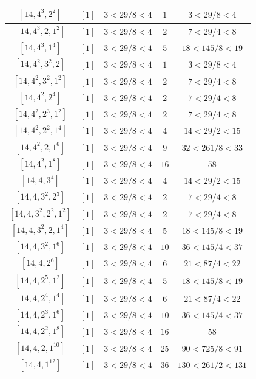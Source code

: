 \documentclass{article}%
\begin{document}
\begin{center}
\begin{longtable}{||c|c|c|c|c||}
$[14, 4^{3}, 2^{2}]$ & $[1]$ & $3 < 29/8 < 4$ & $1$ & $3 < 29/8 < 4$ \\ \hline 
$[14, 4^{3}, 2, 1^{2}]$ & $[1]$ & $3 < 29/8 < 4$ & $2$ & $7 < 29/4 < 8$ \\ \hline 
$[14, 4^{3}, 1^{4}]$ & $[1]$ & $3 < 29/8 < 4$ & $5$ & $18 < 145/8 < 19$ \\ \hline 
$[14, 4^{2}, 3^{2}, 2]$ & $[1]$ & $3 < 29/8 < 4$ & $1$ & $3 < 29/8 < 4$ \\ \hline 
$[14, 4^{2}, 3^{2}, 1^{2}]$ & $[1]$ & $3 < 29/8 < 4$ & $2$ & $7 < 29/4 < 8$ \\ \hline 
$[14, 4^{2}, 2^{4}]$ & $[1]$ & $3 < 29/8 < 4$ & $2$ & $7 < 29/4 < 8$ \\ \hline 
$[14, 4^{2}, 2^{3}, 1^{2}]$ & $[1]$ & $3 < 29/8 < 4$ & $2$ & $7 < 29/4 < 8$ \\ \hline 
$[14, 4^{2}, 2^{2}, 1^{4}]$ & $[1]$ & $3 < 29/8 < 4$ & $4$ & $14 < 29/2 < 15$ \\ \hline 
$[14, 4^{2}, 2, 1^{6}]$ & $[1]$ & $3 < 29/8 < 4$ & $9$ & $32 < 261/8 < 33$ \\ \hline 
$[14, 4^{2}, 1^{8}]$ & $[1]$ & $3 < 29/8 < 4$ & $16$ & $58$ \\ \hline 
$[14, 4, 3^{4}]$ & $[1]$ & $3 < 29/8 < 4$ & $4$ & $14 < 29/2 < 15$ \\ \hline 
$[14, 4, 3^{2}, 2^{3}]$ & $[1]$ & $3 < 29/8 < 4$ & $2$ & $7 < 29/4 < 8$ \\ \hline 
$[14, 4, 3^{2}, 2^{2}, 1^{2}]$ & $[1]$ & $3 < 29/8 < 4$ & $2$ & $7 < 29/4 < 8$ \\ \hline 
$[14, 4, 3^{2}, 2, 1^{4}]$ & $[1]$ & $3 < 29/8 < 4$ & $5$ & $18 < 145/8 < 19$ \\ \hline 
$[14, 4, 3^{2}, 1^{6}]$ & $[1]$ & $3 < 29/8 < 4$ & $10$ & $36 < 145/4 < 37$ \\ \hline 
$[14, 4, 2^{6}]$ & $[1]$ & $3 < 29/8 < 4$ & $6$ & $21 < 87/4 < 22$ \\ \hline 
$[14, 4, 2^{5}, 1^{2}]$ & $[1]$ & $3 < 29/8 < 4$ & $5$ & $18 < 145/8 < 19$ \\ \hline 
$[14, 4, 2^{4}, 1^{4}]$ & $[1]$ & $3 < 29/8 < 4$ & $6$ & $21 < 87/4 < 22$ \\ \hline 
$[14, 4, 2^{3}, 1^{6}]$ & $[1]$ & $3 < 29/8 < 4$ & $10$ & $36 < 145/4 < 37$ \\ \hline 
$[14, 4, 2^{2}, 1^{8}]$ & $[1]$ & $3 < 29/8 < 4$ & $16$ & $58$ \\ \hline 
$[14, 4, 2, 1^{10}]$ & $[1]$ & $3 < 29/8 < 4$ & $25$ & $90 < 725/8 < 91$ \\ \hline 
$[14, 4, 1^{12}]$ & $[1]$ & $3 < 29/8 < 4$ & $36$ & $130 < 261/2 < 131$ \\ \hline 

\end{longtable}
\end{center}
\end{document}
